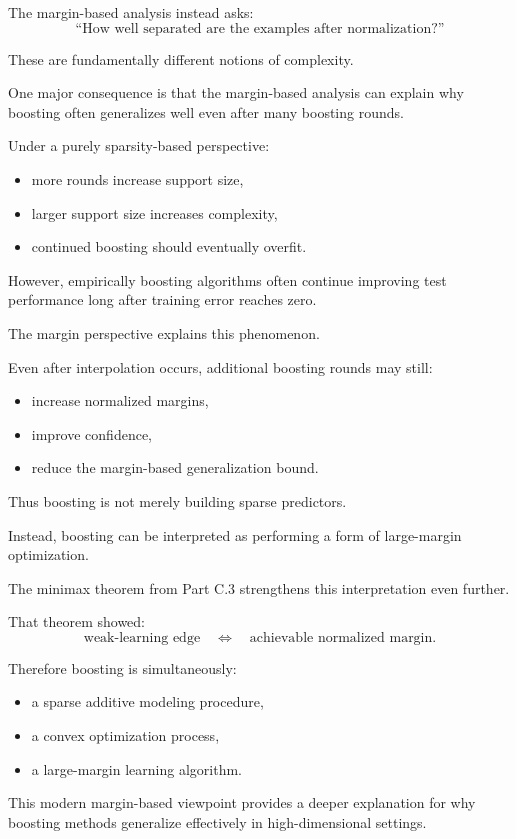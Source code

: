\documentclass[11pt]{article}
\begin{document}
\begin{enumerate}
\begin{solutionbox}
The margin-based analysis instead asks:
\[
\text{``How well separated are the examples after normalization?''}
\]

These are fundamentally different notions of complexity.

\medskip

One major consequence is that the margin-based analysis can explain why boosting often generalizes well even after many boosting rounds.

Under a purely sparsity-based perspective:
\begin{itemize}
    \item more rounds increase support size,
    \item larger support size increases complexity,
    \item continued boosting should eventually overfit.
\end{itemize}

However, empirically boosting algorithms often continue improving test performance long after training error reaches zero.

The margin perspective explains this phenomenon.

Even after interpolation occurs, additional boosting rounds may still:
\begin{itemize}
    \item increase normalized margins,
    \item improve confidence,
    \item reduce the margin-based generalization bound.
\end{itemize}

Thus boosting is not merely building sparse predictors.

Instead, boosting can be interpreted as performing a form of large-margin optimization.

\medskip

The minimax theorem from Part C.3 strengthens this interpretation even further.

That theorem showed:
\[
\text{weak-learning edge}
\quad\Longleftrightarrow\quad
\text{achievable normalized margin}.
\]

Therefore boosting is simultaneously:
\begin{itemize}
    \item a sparse additive modeling procedure,
    \item a convex optimization process,
    \item a large-margin learning algorithm.
\end{itemize}

This modern margin-based viewpoint provides a deeper explanation for why boosting methods generalize effectively in high-dimensional settings.

\end{solutionbox}

\end{enumerate}
\end{document}
